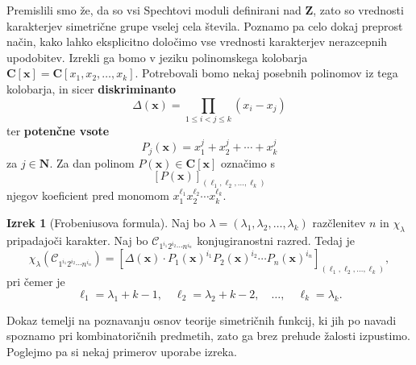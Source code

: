 \documentclass[11pt]{book}
\def\NN{\mathbf{N}}
\def\ZZ{\mathbf{Z}}
\def\CC{\mathbf{C}}
\def\conclass{\mathcal{C}}
\def\definicija{\color{rdeca}\bf}
\theoremstyle{definition}
\theoremstyle{zgled}
\theoremstyle{zgledbrezstevilke}
\theoremstyle{odprtproblem}
\theoremstyle{domacanaloga}
\theoremstyle{izrek}
\newtheorem{izrek}[theorem]{Izrek}
\begin{document}
Premislili smo že, da so vsi Spechtovi moduli definirani nad $\ZZ$, zato so vrednosti karakterjev simetrične grupe vselej cela števila. Poznamo pa celo dokaj preprost način, kako lahko eksplicitno določimo vse vrednosti karakterjev nerazcepnih upodobitev. Izrekli ga bomo v jeziku polinomskega kolobarja $\CC[\mathbf{x}] = \CC[x_1, x_2, \dots, x_k]$. Potrebovali bomo nekaj posebnih polinomov iz tega kolobarja, in sicer {\definicija diskriminanto}
\[
    \Delta(\mathbf{x}) = \prod_{1 \leq i < j \leq k} (x_i - x_j)
\]
ter {\definicija potenčne vsote}
\[
    P_j(\mathbf{x}) = x_1^j + x_2^j + \cdots + x_k^j
\]
za $j \in \NN$. Za dan polinom $P(\mathbf{x}) \in \CC[\mathbf{x}]$ označimo s
\[
    [P(\mathbf{x})]_{(\ell_1, \ell_2, \dots, \ell_k)}
\]
njegov koeficient pred monomom $x_1^{\ell_1} x_2^{\ell_2} \cdots x_k^{\ell_k}$.

\begin{izrek}[Frobeniusova formula]
Naj bo $\lambda = (\lambda_1, \lambda_2, \dots, \lambda_k)$ razčlenitev $n$ in $\chi_{\lambda}$ pripadajoči karakter. Naj bo $\conclass_{1^{i_1} 2^{i_2} \cdots n^{i_n}}$ konjugiranostni razred. Tedaj je 
\[
    \chi_{\lambda}\left(\conclass_{1^{i_1} 2^{i_2} \cdots n^{i_n}}\right) =
    \left[ \Delta(\mathbf{x}) \cdot P_1(\mathbf{x})^{i_1} P_2(\mathbf{x})^{i_2} \cdots P_n(\mathbf{x})^{i_n} \right]_{(\ell_1, \ell_2, \dots, \ell_k)},
\]
pri čemer je
\[
    \ell_1 = \lambda_1 + k - 1, \quad
    \ell_2 = \lambda_2 + k - 2, \quad
    \dots, \quad
    \ell_k = \lambda_k.
\]
\end{izrek}

Dokaz temelji na poznavanju osnov teorije simetričnih funkcij, ki jih po navadi spoznamo pri kombinatoričnih predmetih, zato ga brez prehude žalosti izpustimo. Poglejmo pa si nekaj primerov uporabe izreka.
\end{document}
